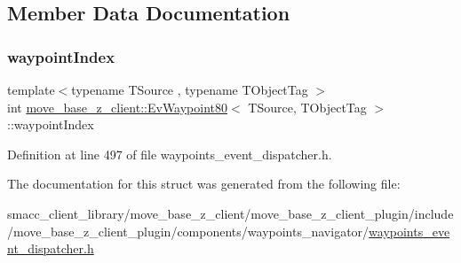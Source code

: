 \subsection{Member Data Documentation}
\mbox{\label{structmove__base__z__client_1_1EvWaypoint80_aa622968a7a25b69aaba51eaab7d9e553}} 
\subsubsection{\texorpdfstring{waypoint\+Index}{waypointIndex}}
{\footnotesize\ttfamily template$<$typename T\+Source , typename T\+Object\+Tag $>$ \\
int \hyperlink{structmove__base__z__client_1_1EvWaypoint80}{move\+\_\+base\+\_\+z\+\_\+client\+::\+Ev\+Waypoint80}$<$ T\+Source, T\+Object\+Tag $>$\+::waypoint\+Index}



Definition at line 497 of file waypoints\+\_\+event\+\_\+dispatcher.\+h.



The documentation for this struct was generated from the following file\+:\begin{DoxyCompactItemize}
\item 
smacc\+\_\+client\+\_\+library/move\+\_\+base\+\_\+z\+\_\+client/move\+\_\+base\+\_\+z\+\_\+client\+\_\+plugin/include/move\+\_\+base\+\_\+z\+\_\+client\+\_\+plugin/components/waypoints\+\_\+navigator/\hyperlink{waypoints__event__dispatcher_8h}{waypoints\+\_\+event\+\_\+dispatcher.\+h}\end{DoxyCompactItemize}
